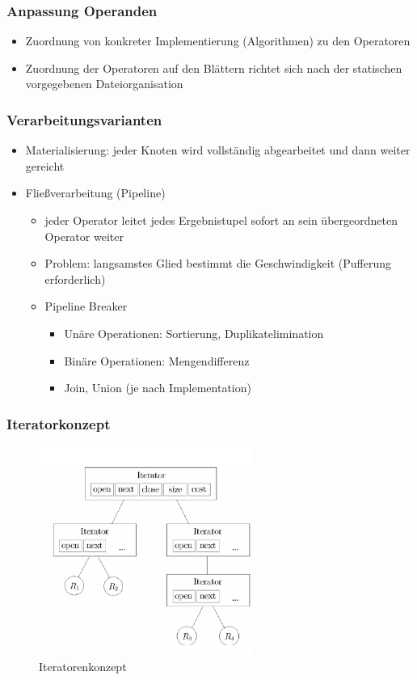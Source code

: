 \documentclass[a4paper]{article}
\begin{document}
    \subsubsection{Anpassung Operanden}
    \begin{itemize}
        \item Zuordnung von konkreter Implementierung (Algorithmen) zu den Operatoren
        \item Zuordnung der Operatoren auf den Blättern richtet sich nach der statischen vorgegebenen Dateiorganisation
    \end{itemize}
    
    \subsubsection{Verarbeitungsvarianten}
    \begin{itemize}
        \item Materialisierung: jeder Knoten wird vollständig abgearbeitet und dann weiter gereicht
        \item Fließverarbeitung (Pipeline)
        \begin{itemize}
            \item jeder Operator leitet jedes Ergebnistupel sofort an sein übergeordneten Operator weiter
            \item Problem: langsamstes Glied bestimmt die Geschwindigkeit (Pufferung erforderlich)
            \item Pipeline Breaker
            \begin{itemize}
                \item Unäre Operationen: Sortierung, Duplikatelimination
                \item Binäre Operationen: Mengendifferenz
                \item Join, Union (je nach Implementation)
            \end{itemize}
        \end{itemize}
    \end{itemize}
    
    \subsubsection{Iteratorkonzept}
    \begin{figure}[htp]
        \centering
        \includegraphics[width=7cm]{images/iteratorKonzept.png}
        \caption{Iteratorenkonzept}
        \label{fig:Iteratorenkonzept}
    \end{figure}
    
\end{document}
